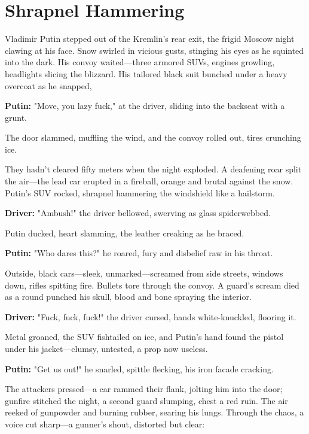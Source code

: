 \documentclass[12pt]{book}
\begin{document}
\vspace{1em}

\section{Shrapnel Hammering}

Vladimir Putin stepped out of the Kremlin’s rear exit, the frigid Moscow night clawing at his face. Snow swirled in vicious gusts, stinging his eyes as he squinted into the dark. His convoy waited—three armored SUVs, engines growling, headlights slicing the blizzard. His tailored black suit bunched under a heavy overcoat as he snapped,

\vspace{0.5em}
\textbf{Putin:} "Move, you lazy fuck," at the driver, sliding into the backseat with a grunt.

The door slammed, muffling the wind, and the convoy rolled out, tires crunching ice.

They hadn’t cleared fifty meters when the night exploded. A deafening roar split the air—the lead car erupted in a fireball, orange and brutal against the snow. Putin’s SUV rocked, shrapnel hammering the windshield like a hailstorm.

\vspace{0.5em}
\textbf{Driver:} "Ambush!" the driver bellowed, swerving as glass spiderwebbed.

Putin ducked, heart slamming, the leather creaking as he braced.

\vspace{0.5em}
\textbf{Putin:} "Who dares this?" he roared, fury and disbelief raw in his throat.

Outside, black cars—sleek, unmarked—screamed from side streets, windows down, rifles spitting fire. Bullets tore through the convoy. A guard’s scream died as a round punched his skull, blood and bone spraying the interior.

\vspace{0.5em}
\textbf{Driver:} "Fuck, fuck, fuck!" the driver cursed, hands white-knuckled, flooring it.

Metal groaned, the SUV fishtailed on ice, and Putin’s hand found the pistol under his jacket—clumsy, untested, a prop now useless.

\vspace{0.5em}
\textbf{Putin:} "Get us out!" he snarled, spittle flecking, his iron facade cracking.

The attackers pressed—a car rammed their flank, jolting him into the door; gunfire stitched the night, a second guard slumping, chest a red ruin. The air reeked of gunpowder and burning rubber, searing his lungs. Through the chaos, a voice cut sharp—a gunner’s shout, distorted but clear:
\end{document}
